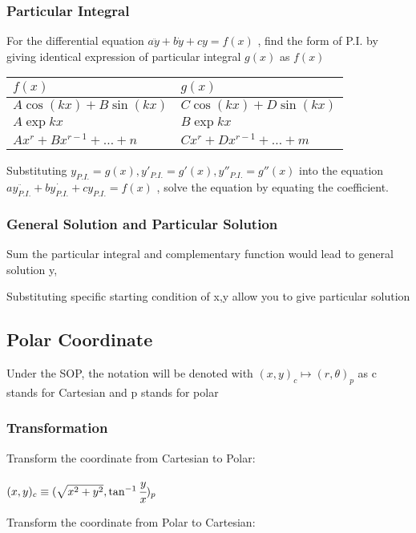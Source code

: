 \documentclass[]{article}
\begin{document}
\subsubsection{Particular Integral}\label{header-n60}

For the differential equation \(a\ddot{y} + b\dot{y} + cy = f(x)\) ,
find the form of P.I. by giving identical expression of particular
integral \(g(x)\) as \(f(x)\)

\begin{longtable}[]{@{}ll@{}}
\toprule
\(f(x)\) & \(g(x)\)\tabularnewline
\midrule
\endhead
\(A\cos(kx) + B\sin(kx)\) & \(C\cos(kx) + D\sin(kx)\)\tabularnewline
\(A\exp{kx}\) & \(B\exp{kx}\)\tabularnewline
\(Ax^r + Bx^{r-1} + \dots + n\) &
\(Cx^r + Dx^{r-1} + \dots + m\)\tabularnewline
\bottomrule
\end{longtable}

Substituting \(y_{P.I.} = g(x),y'_{P.I.} = g'(x),y''_{P.I.} = g''(x)\)
into the equation
\(a\ddot{y_{P.I.}} + b\dot{y_{P.I.}} + cy_{P.I.} = f(x)\) , solve the
equation by equating the coefficient.

\subsubsection{General Solution and Particular
Solution}\label{header-n76}

Sum the particular integral and complementary function would lead to
general solution y,

Substituting specific starting condition of x,y allow you to give
particular solution

\subsection{Polar Coordinate}\label{header-n79}

Under the SOP, the notation will be denoted with
\((x,y)_{c} \longmapsto(r,\theta)_{p}\) as c stands for Cartesian and p
stands for polar

\subsubsection{Transformation}\label{header-n81}

Transform the coordinate from Cartesian to Polar:

\((x,y)_{c} \equiv (\sqrt{x^2 + y^2},\tan^{-1} \cfrac{y}{x})_{p}\)

Transform the coordinate from Polar to Cartesian:
\end{document}
